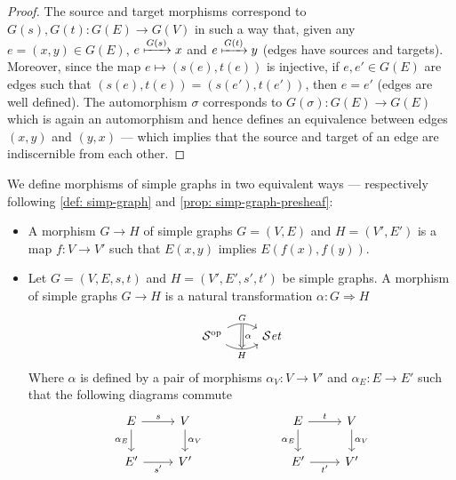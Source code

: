 \begin{proof}
  The source and target morphisms correspond to \(G(s), G(t): G(E) \to G(V)\) in
  such a way that, given any \(e = (x, y) \in G(E)\), \(e \xmapsto{G(s)} x\) and
  \(e \xmapsto{G(t)} y\) (edges have sources and targets). Moreover, since the
  map \(e \mapsto (s(e), t(e))\) is injective, if \(e, e' \in G(E)\) are edges
  such that \((s(e), t(e)) = (s(e'), t(e'))\), then \(e = e'\) (edges are well
  defined). The automorphism \(\sigma\) corresponds to \(G(\sigma): G(E) \to
  G(E)\) which is again an automorphism and hence defines an equivalence between
  edges \((x, y)\) and \((y, x)\) --- which implies that the source and target
  of an edge are indiscernible from each other.
\end{proof}

\begin{definition}
  We define morphisms of simple graphs in two equivalent ways --- respectively
  following \cref{def: simp-graph} and \cref{prop: simp-graph-presheaf}:
  \begin{itemize}
    \setlength\itemsep{0em}
    \item A morphism \(G \to H\) of simple graphs \(G = (V, E)\) and \(H = (V',
      E')\) is a map \(f: V \to V'\) such that \(E(x, y)\) implies \(E(f(x),
      f(y))\).
    \item Let \(G = (V, E, s, t)\) and \(H = (V', E', s', t')\) be simple
      graphs. A morphism of simple graphs \(G \to H\) is a natural
      transformation \(\alpha: G \Rightarrow H\)
      \[
        \begin{tikzcd}
          \cat S^\op
          \ar[r, bend left, "G", ""{name=G}]
          \ar[r, bend right, swap, "H", ""{name=H}]
          &\Set
          \ar[Rightarrow, "\alpha", from=G, to=H]
        \end{tikzcd}
      \]
      Where \(\alpha\) is defined by a pair of morphisms \(\alpha_V: V \to V'\)
      and \(\alpha_E: E \to E'\) such that the following diagrams commute
      \[
        \begin{tikzcd}
          E \ar[r, "s"] \ar[d, swap, "\alpha_E"] &V \ar[d, "\alpha_V"]
          \\
          E' \ar[r, swap, "s'"] &V'
        \end{tikzcd}
        \qquad \qquad \qquad
        \begin{tikzcd}
          E \ar[r, "t"] \ar[d, swap, "\alpha_E"] &V \ar[d, "\alpha_V"]
          \\
          E' \ar[r, swap, "t'"] &V'

\end{tikzcd}\]
\end{itemize}
\end{definition}
